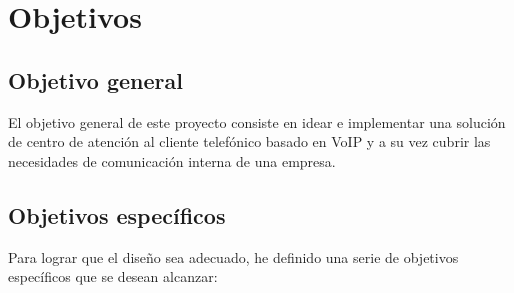 \documentclass[a4paper, 12pt]{book}
\begin{document}


\cleardoublepage %
\chapter{Objetivos} %
\label{chap:objetivos} %

\section{Objetivo general} %
\label{sec:objetivo-general} %

El objetivo general de este proyecto consiste en idear e implementar una solución de centro de atención al cliente telefónico basado en VoIP y a su vez cubrir las necesidades de comunicación interna de una empresa. 


\section{Objetivos específicos}
\label{sec:objetivos-especificos}

Para lograr que el diseño sea adecuado, he definido una serie de objetivos específicos que se desean alcanzar:
\end{document}

